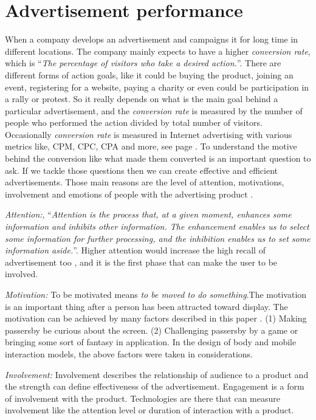 \section{Advertisement performance}
When a company develops an advertisement and campaigns it for long time in different locations. The company mainly expects to have a higher \emph{conversion rate}, which is ``\emph{The percentage of visitors who take a desired action.}''\cite{convrate}. There are different forms of action goals, like it could be buying the product, joining an event, registering for a website, paying a charity or even could be participation in a rally or protest. So it really depends on what is the main goal behind a particular advertisement, and the \emph{conversion rate} is measured by the number of people who performed the action divided by total number of visitors. Occasionally \emph{conversion rate} is measured in Internet advertising with various metrics like, CPM, CPC, CPA and more, see page \pageref{adperformancebackground}. To understand the motive behind the conversion like what made them converted is an important question to ask. If we tackle those questions then we can create effective and efficient advertisements. Those main reasons are the level of attention, motivations, involvement and emotions of people with the advertising product \cite{pervasiv_ad}.

\emph{Attention:}, ``\emph{Attention is the process that, at a given moment, enhances some information and inhibits other information. The enhancement enables us to select some information for further processing, and the inhibition enables us to set some information aside.}''\cite{Attention}. Higher attention would increase the high recall of advertisement too \cite{add_effectivenss}, and it is the first phase that can make the user to be involved.

\emph{Motivation:}
To be motivated means \emph{to be moved to do something}\cite{motiv}.The motivation is an important thing after a person has been attracted toward display. The motivation can be achieved by many factors described in this paper \cite{toward_motivation}. (1) Making passersby be curious about the screen. (2) Challenging passersby by a game or bringing some sort of fantasy in application. In the design of body and mobile interaction models, the above factors were taken in considerations. 

\emph{Involvement:} Involvement describes the relationship of audience to a product and the strength can define effectiveness of the advertisement. Engagement is a form of involvement with the product. Technologies are there that can measure involvement like the attention level or duration of interaction with a product.

